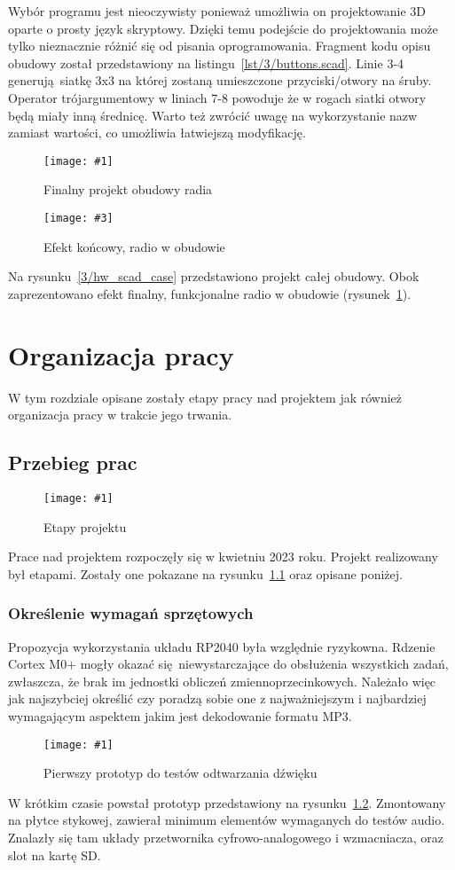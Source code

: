 \documentclass[12pt]{report}
\newcommand{\imgint}[4]{
	\begin{figure}[{#4}]
		\centering
		\texttt{[image: \#1]}
		\caption{#2}
		\label{#1}
	\end{figure}
}
\newcommand{\imgh}[3]{\imgint{#1}{#2}{#3}{H}}
\newcommand{\imgintss}[5]{
	\begin{figure}[{#5}]
		\centering
		\begin{minipage}{.45\textwidth}
			\centering
			\texttt{[image: \#1]}
			\caption{#2}
			\label{#1}
		\end{minipage}%
		\hfill
		\begin{minipage}{.45\textwidth}
			\centering
			\texttt{[image: \#3]}
			\caption{#4}
			\label{#3}
		\end{minipage}
	\end{figure}
}
\newcommand{\imghss}[4]{\imgintss{#1}{#2}{#3}{#4}{H}}
\begin{document}
			Wybór programu jest nieoczywisty ponieważ umożliwia on projektowanie 3D oparte o prosty język skryptowy. Dzięki temu podejście do projektowania może tylko nieznacznie różnić się od pisania oprogramowania. Fragment kodu opisu obudowy został przedstawiony na listingu~\ref{lst/3/buttons.scad}. Linie 3-4 generują siatkę 3x3 na której zostaną umieszczone przyciski/otwory na śruby. Operator trójargumentowy w liniach 7-8 powoduje że w rogach siatki otwory będą miały inną średnicę. Warto też zwrócić uwagę na wykorzystanie nazw zamiast wartości, co umożliwia łatwiejszą modyfikację.
			
			\imghss{3/hw_scad_case}{Finalny projekt obudowy radia}{3/hw_case}{Efekt końcowy, radio w obudowie}
			
			Na rysunku~\ref{3/hw_scad_case} przedstawiono projekt całej obudowy. Obok zaprezentowano efekt finalny, funkcjonalne radio w obudowie (rysunek~\ref{3/hw_case}).
			
\chapter{Organizacja pracy}
	W tym rozdziale opisane zostały etapy pracy nad projektem jak również organizacja pracy w trakcie jego trwania.
	
	\section{Przebieg prac}
		\imgh{4/PicoRadio-steps}{Etapy projektu}{1}
	
		Prace nad projektem rozpoczęły się w kwietniu 2023 roku. Projekt realizowany był etapami. Zostały one pokazane na rysunku~\ref{4/PicoRadio-steps} oraz opisane poniżej.
		
		\subsection{Określenie wymagań sprzętowych}
			Propozycja wykorzystania układu RP2040 była względnie ryzykowna. Rdzenie Cortex M0+ mogły okazać się niewystarczające do obsłużenia wszystkich zadań, zwłaszcza, że brak im jednostki obliczeń zmiennoprzecinkowych. Należało więc jak najszybciej określić czy poradzą sobie one z najważniejszym i najbardziej wymagającym aspektem jakim jest dekodowanie formatu MP3.
			
			\imgh{4/prototype_1}{Pierwszy prototyp do testów odtwarzania dźwięku}{0.6}
			
			W krótkim czasie powstał prototyp przedstawiony na rysunku~\ref{4/prototype_1}. Zmontowany na płytce stykowej, zawierał minimum elementów wymaganych do testów audio. Znalazły się tam układy przetwornika cyfrowo-analogowego i wzmacniacza, oraz slot na kartę SD.
			
\end{document}
